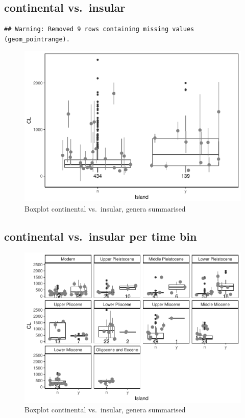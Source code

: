 \documentclass[]{article}
\begin{document}
\subsection{continental vs.~insular}\label{continental-vs.insular-1}

\begin{verbatim}
## Warning: Removed 9 rows containing missing values (geom_pointrange).
\end{verbatim}

\begin{figure}[htbp]
\centering
\includegraphics{MA_JJ_files/figure-latex/Boxplot continental vs. insular-1.pdf}
\caption{Boxplot continental vs.~insular, genera summarised}
\end{figure}

\subsection{continental vs.~insular per time
bin}\label{continental-vs.insular-per-time-bin-1}

\begin{figure}[htbp]
\centering
\includegraphics{MA_JJ_files/figure-latex/Boxplot continental vs. insular, split into time bins-1.pdf}
\caption{Boxplot continental vs.~insular, genera summarised}
\end{figure}
\end{document}
